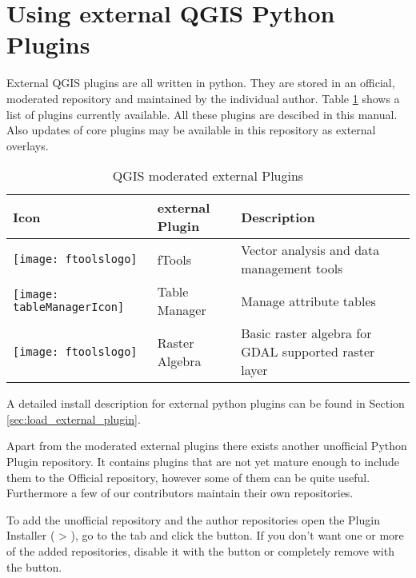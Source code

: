 
\section{Using external QGIS Python Plugins}\label{sec:external_plugins}

\updatedisclaimer

External QGIS plugins are all written in python. They are stored in 
an official, moderated repository and maintained by the individual 
author. Table \ref{tab:external_plugins} shows a list of plugins 
currently available. All these plugins are descibed in this manual.
Also updates of core plugins may be available in this repository as external overlays.

\begin{table}[H]
\centering
\caption{QGIS moderated external Plugins}\label{tab:external_plugins}\medskip
\small
 \begin{tabular}{|l|l|p{4in}|}
\hline \textbf{Icon} & \textbf{external Plugin} & \textbf{Description}\\
\hline
\texttt{[image: ftoolslogo]}
 & fTools \index{plugins!fTools} & Vector analysis and data management tools\\
\hline
\texttt{[image: tableManagerIcon]}
 & Table Manager \index{plugins!Table Manager}& Manage attribute tables \\
\hline
\texttt{[image: ftoolslogo]}
 & Raster Algebra \index{plugins!Raster Algebra}& Basic raster algebra 
for GDAL supported raster layer\\
\hline
\end{tabular}
\end{table}

A detailed install description for external python plugins can be found in 
Section \ref{sec:load_external_plugin}.


Apart from the moderated external plugins there exists another unofficial
Python Plugin repository. It contains plugins that are not yet mature
enough to include them to the Official repository, however some of them
can be quite useful. Furthermore a few of our contributors maintain
their own repositories.

To add the unofficial repository and the author repositories open the 
Plugin Installer ( > ),
go to the  tab and click the 
button. If you don't want one or more of the added repositories, disable it with the
 button or completely remove with the  button.

\begin{Tip} \caption{\textsc{Add more external Plugins}}
\end{Tip}




